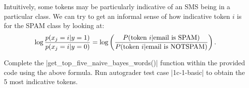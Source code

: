 \item {}
Intuitively, some tokens may be particularly indicative of an SMS being
in a particular class.  We can try to get an informal sense of how indicative
token $i$ is for the SPAM class by looking at:
\begin{equation*}
  \log \frac{p(x_j = i\vert  y=1)}{p(x_j = i\vert y=0)}
  = \log\left(\frac{P(\hbox{token $i$} \vert  \hbox{email is SPAM})}
    {P(\hbox{token $i$} \vert  \hbox{email is NOTSPAM})}\right).
\end{equation*}

Complete the |get_top_five_naive_bayes_words()| function within the provided code using the above formula.  Run autograder test case |1c-1-basic| to obtain the 5 most indicative tokens.